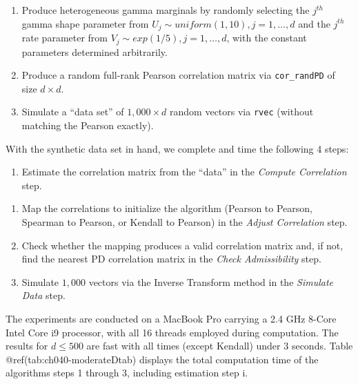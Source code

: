 \documentclass[
]{jss}
\providecommand{\tightlist}{%
  \setlength{\itemsep}{0pt}\setlength{\parskip}{0pt}}
\begin{document}
\begin{enumerate}
\def\labelenumi{\arabic{enumi}.}
\tightlist
\item
  Produce heterogeneous gamma marginals by randomly selecting the
  \(j^{th}\) gamma shape parameter from
  \(U_j \sim uniform(1,10), j=1,\ldots,d\) and the \(j^{th}\) rate
  parameter from \(V_j \sim exp(1/5), j=1,\ldots,d\), with the constant
  parameters determined arbitrarily.
\item
  Produce a random full-rank Pearson correlation matrix via
  \texttt{cor\_randPD} of size \(d \times d\).
\item
  Simulate a ``data set'' of \(1,000 \times d\) random vectors via
  \texttt{rvec} (without matching the Pearson exactly). 
\end{enumerate}

With the synthetic data set in hand, we complete and time the following
4 steps:


\begin{enumerate}
\def\labelenumi{\roman{enumi}.}
\tightlist
\item
  Estimate the correlation matrix from the ``data'' in the \emph{Compute
  Correlation} step.
\end{enumerate}

\begin{enumerate}
\def\labelenumi{\arabic{enumi}.}
\tightlist
\item
  Map the correlations to initialize the algorithm (Pearson to Pearson,
  Spearman to Pearson, or Kendall to Pearson) in the \emph{Adjust
  Correlation} step.
\item
  Check whether the mapping produces a valid correlation matrix and, if
  not, find the nearest PD correlation matrix in the \emph{Check
  Admissibility} step.
\item
  Simulate \(1,000\) vectors via the Inverse Transform method in the
  \emph{Simulate Data} step. 
\end{enumerate}

The experiments are conducted on a MacBook Pro carrying a 2.4 GHz 8-Core
Intel Core i9 processor, with all 16 threads employed during
computation. The results for \(d \leq 500\) are fast with all times
(except Kendall) under 3 seconds. Table @ref(tab:ch040-moderateDtab)
displays the total computation time of the algorithms steps 1 through 3,
including estimation step i.
\end{document}
